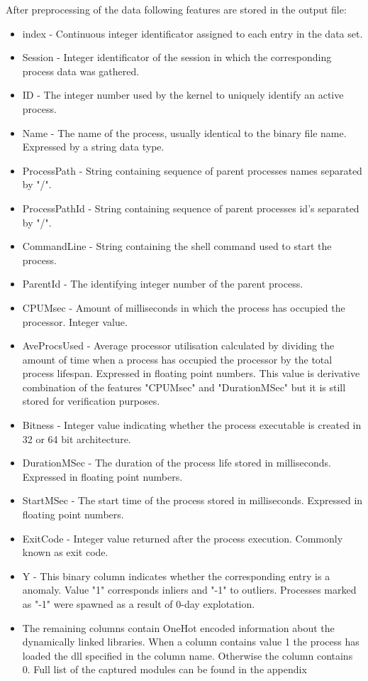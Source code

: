 \documentclass[a4paper,twoside,12pt]{book}
\begin{document}
After preprocessing of the data following features are stored in the output file:
\begin{itemize}
	\item index - Continuous integer identificator assigned to each entry in the data set.
	\item Session - Integer identificator of the session in which the corresponding process data 
	was gathered.
	\item ID -  The integer number used by the kernel to uniquely identify an active process.
	\item Name -  The name of the process, usually identical to the binary file name. Expressed by a 
	string data type.
	\item ProcessPath - String containing sequence of parent processes names separated by "/".
	\item ProcessPathId - String containing sequence of parent processes id's separated by "/".
	\item CommandLine - String containing the shell command used to start the process.
	\item ParentId - The identifying integer number of the parent process. 
	\item CPUMsec - Amount of milliseconds in which the process has occupied the processor. Integer value.
	\item AveProcsUsed -  Average processor utilisation calculated by dividing the amount of time 
	when a process has occupied the processor by the total process lifespan. Expressed in floating 
	point numbers. This value is derivative combination of the features "CPUMsec" and "DurationMSec"
	but it is still stored for verification purposes.
	\item Bitness - Integer value indicating whether the process executable is created in 
	32 or 64 bit architecture.
	\item DurationMSec - The duration of the process life stored in milliseconds. Expressed in 
	floating point numbers.
	\item StartMSec -  The start time of the process stored in milliseconds. Expressed in floating 
	point numbers.
	\item ExitCode - Integer value returned after the process execution. Commonly known as exit code.
	\item Y - This binary column indicates whether the corresponding entry is a anomaly. Value "1" corresponds
	inliers and "-1" to outliers. Processes marked as "-1" were spawned as a result of 0-day explotation.
	\item The remaining columns contain OneHot encoded information about the dynamically linked 
libraries. When a column contains value 1 the process has loaded the dll specified in the 
column name. Otherwise the column contains 0. Full list of the captured modules can be 
found in the appendix %
\end{itemize}
\end{document}
